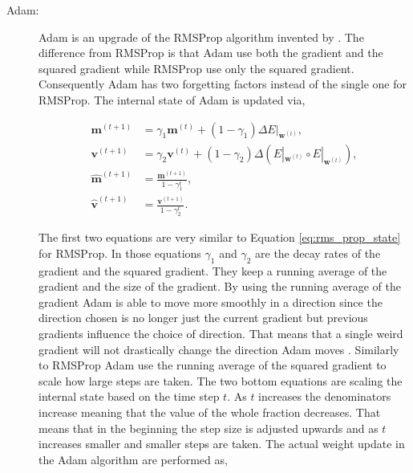 \begin{description}
    \item[\gls{Adam}:]

        \gls{Adam} is an upgrade of the \gls{RMSProp} algorithm invented by
        \cite{DBLP:journals/corr/KingmaB14}. The difference from \gls{RMSProp}
        is that \gls{Adam} use both the gradient and the squared gradient while
        \gls{RMSProp} use only the squared gradient. Consequently \gls{Adam} has
        two forgetting factors instead of the single one for \gls{RMSProp}. The
        internal state of \gls{Adam} is updated via,

        \begin{align}
            \mathbf{m}^{(t+1)} &=
                \gamma_1\mathbf{m}^{(t)} +
                (1 - \gamma_1) \Delta E|_{\mathbf{w}^{(t)}}, \\
            \mathbf{v}^{(t+1)} &=
                \gamma_2\mathbf{v}^{(t)} +
                (1 - \gamma_2) \Delta \left(
                    E|_{\mathbf{w}^{(t)}} \circ E|_{\mathbf{w}^{(t)}}
                \right), \\
            \mathbf{\hat{m}}^{(t+1)} &=
                \frac{\mathbf{m}^{(t+1)}}{1 - \gamma_1^t}, \\
            \mathbf{\hat{v}}^{(t+1)} &=
                \frac{\mathbf{v}^{(t+1)}}{1 - \gamma_2^t}.
        \end{align}

        The first two equations are very similar to Equation
        \eqref{eq:rms_prop_state} for \gls{RMSProp}. In those equations
        $\gamma_1$ and $\gamma_2$ are the decay rates of the gradient and the
        squared gradient. They keep a running average of the gradient and the
        size of the gradient. By using the running average of the gradient
        \gls{Adam} is able to move more smoothly in a direction since the
        direction chosen is no longer just the current gradient but previous
        gradients influence the choice of direction. That means that a single
        weird gradient will not drastically change the direction \gls{Adam}
        moves \cite{DBLP:journals/corr/KingmaB14}. Similarly to \gls{RMSProp}
        \gls{Adam} use the running average of the squared gradient to scale how
        large steps are taken. The two bottom equations are scaling the internal
        state based on the time step $t$. As $t$ increases the denominators
        increase meaning that the value of the whole fraction decreases. That
        means that in the beginning the step size is adjusted upwards and as $t$
        increases smaller and smaller steps are taken. The actual weight update
        in the \gls{Adam} algorithm are performed as,


\end{description}
